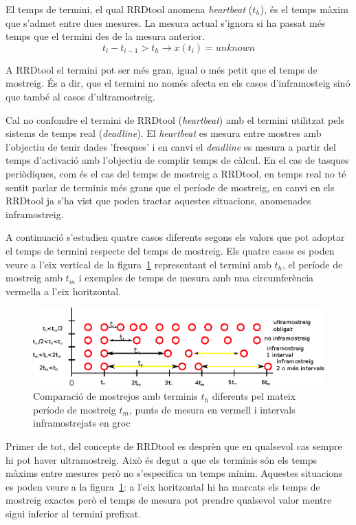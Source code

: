 El temps de termini, el qual RRDtool anomena \emph{heartbeat} ($t_h$), és el temps màxim que s'admet entre dues mesures. La mesura actual s'ignora si ha passat més temps que el termini des de la mesura anterior. 
$$
t_i - t_{i-1} > t_h \longrightarrow   x(t_i) = unknown 
$$
 
A RRDtool el termini pot ser més gran, igual o més petit que el temps de mostreig. És a dir, que el termini no només afecta en els casos d'inframosteig sinó que també al casos d'ultramostreig.


Cal no confondre el termini de RRDtool (\emph{heartbeat})  amb el termini utilitzat pels sistems de temps real (\emph{deadline}). El \emph{heartbeat} es mesura entre mostres amb l'objectiu de tenir dades 'fresques' i en canvi el \emph{deadline} es mesura a partir del temps d'activació amb l'objectiu de complir temps de càlcul. En el cas de tasques periòdiques, com és el cas del temps de mostreig a RRDtool, en temps real no té sentit parlar de terminis més grans que el període de mostreig, en canvi en els RRDtool ja s'ha vist que poden tractar aquestes situacions, anomenades inframostreig.


A continuació s'estudien  quatre casos diferents segons els valors que pot adoptar el temps de termini respecte del temps de mostreig. Els quatre casos es poden veure a l'eix vertical de la figura~\ref{fig:rrdtool:terminis} representant el termini amb $t_h$, el període de mostreig amb $t_m$ i exemples de temps de mesura amb una circumferència vermella a l'eix horitzontal. 

\begin{figure}[htp]
  \centering
  \includegraphics[width=\textwidth]{imatges/rrdtool/terminis.eps}
  \caption{Comparació de mostrejos amb terminis $t_h$ diferents pel mateix període de mostreig $t_m$, punts de mesura en vermell i intervals inframostrejats en groc}
  \label{fig:rrdtool:terminis}
\end{figure}

Primer de tot, del concepte de RRDtool es desprèn que en qualsevol cas sempre hi pot haver ultramostreig. Això és degut a que els terminis són els temps màxims entre mesures però no s'especifica un temps mínim. Aquestes situacions es poden veure a la figura~\ref{fig:rrdtool:terminis}: a l'eix horitzontal hi ha marcats els temps de mostreig exactes però el temps de mesura pot prendre qualsevol valor mentre sigui inferior al termini prefixat.


